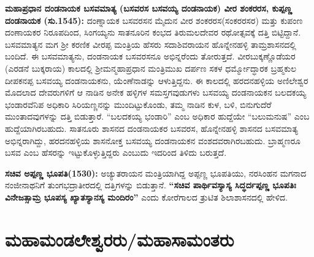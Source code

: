 \textbf{ಮಹಾಪ್ರಧಾನ ದಂಡನಾಯಕ ಬಸವಮಾತ್ಯ (ಬಸವರಸ \general{\enginline{-}} ಬಸವಯ್ಯ ದಂಡನಾಯಕ) ವೀರ ಶಂಕರರಸ, ಕುಪ್ಪಣ್ಣ ದಂಡನಾಯಕ (ಸು.1545):} ದಂಣ್ನಾಯಕ ಬಸವರಸನ ಮೈದುನ ವೀರ ಶಂಕರರಸ(ಸಂಕರರಸರ) ಮತ್ತು ಕುಪಂಣ ದಂಣಾಯಕರ ನಿರೂಪದಿಂದ, ಸಿಂಗಯ್ಯನು ಸಾತನೂರಿನ ಕಂಭದ ತಿರುಮಲದೇವರ ರಥೋತ್ಸವಕ್ಕೆ ದತ್ತಿ ಬಿಟ್ಟಿದ್ದಾನೆ. ಬಸವಮಾತ್ಯನ ಮಗ ಶ‍್ರೀ ಕರಣಿಕ ವೀರಪ್ಪ ಮಂತ್ರಿಯ ಹೆಸರು ಸದಾಶಿವರಾಯನ ಹೊನ್ನೇನಹಳ್ಳಿ ತಾಮ್ರಶಾಸನದಲ್ಲಿ ಬಂದಿದೆ. ಈ ಬಸವಮಾತ್ಯನು, ದಂಡನಾಯಕ ಬಸವರಸನೂ ಅಭಿನ್ನರೆಂದು ತೋರುತ್ತದೆ. ವೀರಬುಕ್ಕಣ್ಣೊಡೆಯರ (ಎರಡನೆ ಬುಕ್ಕರಾಯ) ಕಾಲದಲ್ಲಿ ಶ‍್ರೀಮನ್ಮಹಾಪ್ರಧಾನ ಮಂತ್ರಿಮುಖ ದರ್ಪಣ ಸಕಳ ಧರ್ಮ್ಮೋದ್ಧಾರಕ ಬ್ರಹ್ಮಕುಲ ದೀಪಕನಪ್ಪ ಬಸವಯ್ಯ ದಂಡನಾಯಕನು, ಯೆಂಣೆನಾಡನ್ನು ಆಳುತ್ತಿದ್ದನು. ಈ ಕಾಲದಲ್ಲಿ ಹರದನಹಳ್ಳಿಯ ಅಣಿಲೇಶ್ವರ ಮೊದಲಾದ ದೇವರುಗಳಿಗೆ ಆ ನಾಡಿನ ಅನೇಕ ಹಳ್ಳಿಗಳ ಸಮಸ್ತಗವುಡುಗಳು ಬಸವಯ್ಯ ದಂಡನಾಯಕನ ಬಲದಕಯ್ಯ ಭಂಡಾರವೆನಿಪ ಅಧಿಕಾರಿ ಸಿರಿಯಣ್ಣನನ್ನು ಮುಂದಿಟ್ಟುಕೊಂಡು, ತಮ್ಮ ನಾಡಿನ ಕುಳ, ಬಳಿ, ಬಿನುಗುದೆರೆ ಮುಂತಾದವುಗಳನ್ನು ದತ್ತಿ ಬಿಡುತ್ತಾರೆ. “ಬಲದಕಯ್ಯ ಭಂಡಾರಿ” ಎಂಬ ಅಧಿಕಾರ ಹುದ್ದೆಯೇ “ಬಲುಮನುಷ” ಎಂಬ ಹುದ್ದೆಯಾಗಿರಬಹುದು. ಸಾತನೂರು ಶಾಸನದ ದಂಡನಾಯಕರ ಬಸವರಸ, ಹೊನ್ನೇನಹಳ್ಳಿ ಶಾಸನದ ಬಸವಮಾತ್ಯ ಅಭಿನ್ನರಾಗಿದ್ದು, ಹರದನಹಳ್ಳಿಯ ಶಾಸನೋಕ್ತ ಬಸವಯ್ಯ ದಂಡನಾಯಕನ ವಂಶದವರಾಗಿರಬಹುದು. ಬ್ರಾಹ್ಮಣರೂ ಬಸವ ಎಂಬ ಹೆಸರನ್ನು ಇಟ್ಟುಕೊಳ್ಳುತ್ತಿದ್ದರು ಎಂಬುದು ಇದರಿಂದ ತಿಳಿದು ಬರುತ್ತದೆ.

\textbf{ಸಚಿವ ಅಪ್ಪಣ್ಣ ಭೂಪತಿ(1530):} ಅಚ್ಯುತರಾಯನ ಮಂತ್ರಿಯಾಗಿದ್ದ ಅಪ್ಪಣ್ಣ ಭೂಪತಿಯು, ನರಸಿಂಹನ ಮಗನಾದ ನಂಜೀನಾಥನಿಗೆ ತುಂಗಭದ್ರಾತೀರದಲ್ಲಿ ದತ್ತಿಗಳನ್ನು ಬಿಡುತ್ತಾನೆ. \textbf{“ಸಚಿವ ಪಾರ್ಥಿವಸ್ಯಾಸ್ಯ ಸಿದ್ಧರ್ದಪ್ಪಣ್ಣ ಭೂಪತಿಃ ವಿನೇಜತ್ಸಾಮ್ರ ಭೂಪಸ್ಯ ಖ್ಯಾತಸ್ಯಾನಸ್ಯ ಮಂದಿರಂ”} ಎಂದು ಕೋರೆಗಾಲದ ತ್ರುಟಿತ ಶಿಲಾಶಾಸನದಲ್ಲಿ ಹೇಳಿದ.

\section*{ಮಹಾಮಂಡಲೇಶ್ವರರು/ಮಹಾಸಾಮಂತರು}

